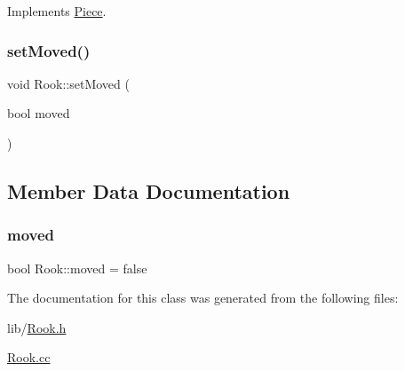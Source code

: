 Implements \hyperlink{class_piece_a8891924c280568529878549f59541925}{Piece}.

\mbox{\label{class_rook_a3ce8295607d89754d8c4be1813bc7b70}} 
\subsubsection{\texorpdfstring{set\+Moved()}{setMoved()}}
{\footnotesize\ttfamily void Rook\+::set\+Moved (\begin{DoxyParamCaption}\item[{bool}]{moved }\end{DoxyParamCaption})}



\subsection{Member Data Documentation}
\mbox{\label{class_rook_a2066de8a5df66bf3b8089d9d33e079ab}} 
\subsubsection{\texorpdfstring{moved}{moved}}
{\footnotesize\ttfamily bool Rook\+::moved = false\hspace{0.3cm}{\ttfamily [private]}}



The documentation for this class was generated from the following files\+:\begin{DoxyCompactItemize}
\item 
lib/\hyperlink{_rook_8h}{Rook.\+h}\item 
\hyperlink{_rook_8cc}{Rook.\+cc}\end{DoxyCompactItemize}

